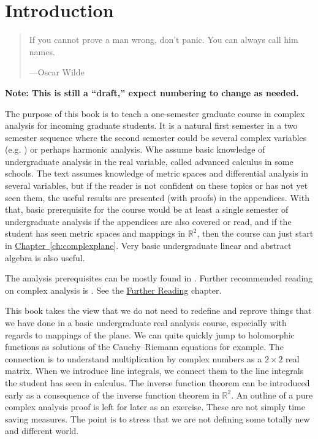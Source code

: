 \documentclass[12pt,openany]{book}
\newcommand{\R}{{\mathbb{R}}}
\theoremstyle{plain}
\theoremstyle{remark}
\theoremstyle{definition}
\newenvironment{myquote}{%
    \begin{quote}%
    \begingroup\itshape
}{%
    \endgroup%
    \end{quote}
}
\theoremstyle{exercise}
\theoremstyle{example}
\newcommand{\Chapterref}[1]{\hyperref[#1]{Chapter~\ref*{#1}}}
\begin{document}
\chapter*{Introduction} \label{ch:intro}

\begin{myquote}
If you cannot prove a man wrong, don't panic. You can always call him names.

---Oscar Wilde 
\end{myquote}

\noindent
\hfill\textbf{Note: This is still a ``draft,'' expect numbering to change as
needed.}\hfill
\medskip

The purpose of this book is to teach a one-semester graduate course in
complex analysis for incoming graduate students.
It is a natural first semester in a two semester sequence where the second
semester could be several complex variables (e.g. \cite{scv:book})
or perhaps harmonic analysis.
Whe assume basic knowledge of undergraduate
analysis in the real variable, called advanced calculus in some schools.
The text assumes knowledge of metric spaces
and differential analysis in several variables, but if the reader is not
confident on these topics or has not yet seen them, the useful results
are presented (with proofs) in the appendices.
With that, basic prerequisite for the
course would be at least a single semester of undergraduate analysis if the
appendices are also covered or read, and if the student has
seen metric spaces and mappings in $\R^2$, then the course
can just start in \Chapterref{ch:complexplane}.  Very basic undergraduate
linear and abstract algebra is also useful.

The analysis prerequisites can be mostly found in
\cites{ra:book,ra:book2,Rudin:principles}.  Further recommended
reading on complex analysis is \cites{Boas,Conway1,Conway2,Rudin,Ullrich}.
See the
\hyperref[ch:furtherreading]{Further Reading} chapter.

This book takes the view that we do not need to redefine and reprove
things that we have done in a basic undergraduate real analysis course,
especially with
regards to mappings of the plane.  We can quite quickly jump to
holomorphic functions as solutions of the Cauchy--Riemann equations for
example.
The connection is to understand multiplication by complex numbers
as a $2 \times 2$ real matrix.
When we introduce line integrals, we connect
them to the line integrals the student has seen in calculus.
The inverse function theorem can be introduced early as
a consequence of the inverse function theorem in $\R^2$.
An outline of a pure complex analysis proof is left for later as an exercise.
These are not simply time saving measures.
The point is to stress that we are not defining some totally new and
different world.
\end{document}
